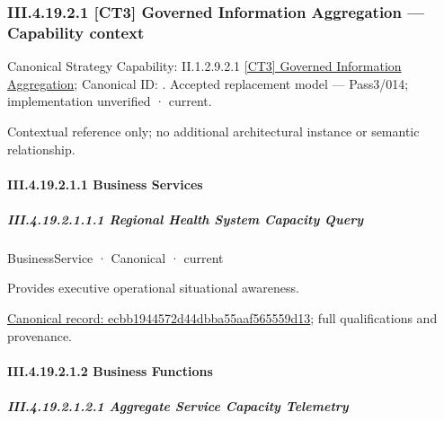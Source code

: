\subsubsection*{III.4.19.2.1 [CT3] Governed Information Aggregation — Capability context}
\label{navigation:III.4.19.2.1}

{\small Canonical Strategy Capability: II.1.2.9.2.1 \hyperref[element:97909bca83fd4ece8d35e64243923b9d]{[CT3] Governed Information Aggregation}; Canonical ID: \texttt{}. Accepted replacement model — Pass3/014; implementation unverified · current.}\par
Contextual reference only; no additional architectural instance or semantic relationship.\par
\paragraph*{III.4.19.2.1.1 Business Services}
\label{navigation:III.4.19.2.1.1}

\subparagraph*{III.4.19.2.1.1.1 Regional Health System Capacity Query}
\label{navigation:III.4.19.2.1.1.1}

\label{element:ecbb1944572d44dbba55aaf565559d13}
{\small BusinessService · Canonical · current}\par

Provides executive operational situational awareness.


{\footnotesize \href{../../../../continuum/business/business-service/ecbb1944572d44dbba55aaf565559d13.md}{Canonical record: ecbb1944572d44dbba55aaf565559d13}; full qualifications and provenance.}\par
\paragraph*{III.4.19.2.1.2 Business Functions}
\label{navigation:III.4.19.2.1.2}

\subparagraph*{III.4.19.2.1.2.1 Aggregate Service Capacity Telemetry}
\label{navigation:III.4.19.2.1.2.1}

